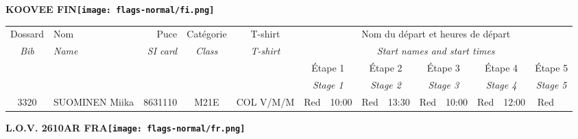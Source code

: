 \documentclass{report}
\begin{document}
\newpage
  \Huge \centering \bfseries KOOVEE  FIN\normalfont \footnotesize \sffamily \hfill \texttt{[image: flags-normal/fi.png]} \newline 
  \begin{longtable}{|c|l|r|c|c|*{5}{cc|}}
    Dossard & Nom  & Puce    & Catégorie & T-shirt & \multicolumn{10}{c|}{Nom du départ et heures de départ} \\
    \itshape Bib     & \itshape Name & \itshape SI card & \itshape Class  & \itshape  T-shirt  & \multicolumn{10}{c|}{\itshape Start names and start times} \\
    \hline
    & & & & & \multicolumn{2}{c|}{Étape 1} & \multicolumn{2}{c|}{Étape 2} & \multicolumn{2}{c|}{Étape 3} & \multicolumn{2}{c|}{Étape 4} & \multicolumn{2}{c|}{Étape 5} \\
    & & & & & \multicolumn{2}{c|}{\itshape Stage 1} & \multicolumn{2}{c|}{\itshape Stage 2} & \multicolumn{2}{c|}{\itshape Stage 3} & \multicolumn{2}{c|}{\itshape Stage 4} & \multicolumn{2}{c|}{\itshape Stage 5} \\
    \hline
    3320 & SUOMINEN Miika & 8631110 & M21E & COL V/M/M & Red & 10:00 & Red & 13:30 & Red & 10:00 & Red & 12:00 & Red &  \\
  \end{longtable}
\newpage
  \Huge \centering \bfseries L.O.V. 2610AR FRA\normalfont \footnotesize \sffamily \hfill \texttt{[image: flags-normal/fr.png]} \newline 
\end{document}
